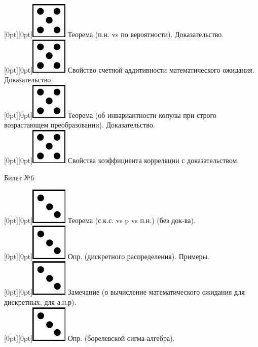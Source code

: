 \documentclass[10pt]{article}
\begin{document}
\raisebox{-1pt}[0pt][0pt]{\includegraphics[width=0.02\linewidth]{5.png}} Теорема (п.н. vs по вероятности). Доказательство. \\

\raisebox{-1pt}[0pt][0pt]{\includegraphics[width=0.02\linewidth]{5.png}}  Свойство счетной аддитивности математического ожидания. Доказательство. \\

\raisebox{-1pt}[0pt][0pt]{\includegraphics[width=0.02\linewidth]{5.png}} Теорема (об инвариантности копулы при строго возрастающем преобразовании). Доказательство. \\

\raisebox{-1pt}[0pt][0pt]{\includegraphics[width=0.02\linewidth]{5.png}} Свойства коэффициента корреляции с доказательством. \\

\begin{center} {\Large Билет №6} \end{center} 

\raisebox{-1pt}[0pt][0pt]{\includegraphics[width=0.02\linewidth]{3.png}} Теорема (с.к.с. vs p vs п.н.) (без док-ва). \\ 

\raisebox{-1pt}[0pt][0pt]{\includegraphics[width=0.02\linewidth]{3.png}} Опр. (дискретного распределения). Примеры. \\

\raisebox{-1pt}[0pt][0pt]{\includegraphics[width=0.02\linewidth]{3.png}} Замечание (о вычисление  математического ожидания для дискретных, для а.н.р). \\

\raisebox{-1pt}[0pt][0pt]{\includegraphics[width=0.02\linewidth]{3.png}} Опр. (борелевской сигма-алгебра). \\
\end{document}
